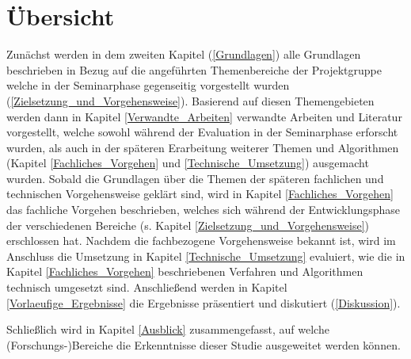 \section{Übersicht}

Zunächst werden in dem zweiten Kapitel (\ref{Grundlagen}) alle Grundlagen beschrieben in Bezug auf die angeführten Themenbereiche der Projektgruppe welche in der Seminarphase gegenseitig vorgestellt wurden (\ref{Zielsetzung_und_Vorgehensweise}). Basierend auf diesen Themengebieten werden dann in Kapitel \ref{Verwandte_Arbeiten} verwandte Arbeiten und Literatur vorgestellt, welche sowohl während der Evaluation in der Seminarphase erforscht wurden, als auch in der späteren Erarbeitung weiterer Themen und Algorithmen (Kapitel \ref{Fachliches_Vorgehen} und \ref{Technische_Umsetzung}) ausgemacht wurden. Sobald die Grundlagen über die Themen der späteren fachlichen und technischen Vorgehensweise geklärt sind, wird in Kapitel \ref{Fachliches_Vorgehen} das fachliche Vorgehen beschrieben, welches sich während der Entwicklungsphase der verschiedenen Bereiche (s. Kapitel \ref{Zielsetzung_und_Vorgehensweise}) erschlossen hat. Nachdem die fachbezogene Vorgehensweise bekannt ist, wird im Anschluss die Umsetzung in Kapitel \ref{Technische_Umsetzung} evaluiert, wie die in Kapitel \ref{Fachliches_Vorgehen} beschriebenen Verfahren und Algorithmen technisch umgesetzt sind. Anschließend werden in Kapitel \ref{Vorlaeufige_Ergebnisse} die Ergebnisse präsentiert und diskutiert (\ref{Diskussion}).


Schließlich wird in Kapitel \ref{Ausblick} zusammengefasst, auf welche (Forschungs-)Bereiche die Erkenntnisse dieser Studie ausgeweitet werden können.

